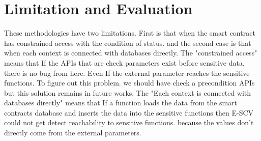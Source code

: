 \section{Limitation and Evaluation}



These methodologies have two limitations. First is that when the smart contract has constrained access with the condition of status. and the second case is that when each context is connected with databases directly. 
The "constrained access" means that If the APIs that are check parameters exist before sensitive data, there is no bug from here. Even If the external parameter reaches the sensitive functions. To figure out this problem. we should have check a precondition APIs but this solution remains in future works.
The "Each context is connected with databases directly" means that If a function loads the data from the smart contracts database and inserts the data into the sensitive functions then E-SCV could not get detect reachability to sensitive functions. because the values don't directly come from the external parameters. 



